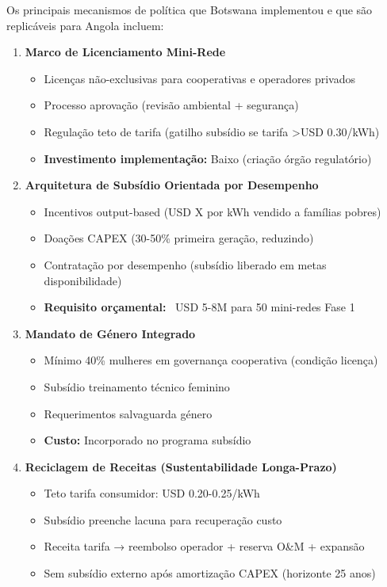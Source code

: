 \documentclass[12pt, a4paper]{article}
\begin{document}
{{{{{{{{{{{{{Os principais mecanismos de política que Botswana implementou e que são replicáveis para Angola incluem:

\begin{enumerate}
\item \textbf{Marco de Licenciamento Mini-Rede}
   \begin{itemize}
   \item Licenças não-exclusivas para cooperativas e operadores privados
   \item Processo aprovação (revisão ambiental + segurança)
   \item Regulação teto de tarifa (gatilho subsídio se tarifa >USD 0.30/kWh)
   \item \textbf{Investimento implementação:} Baixo (criação órgão regulatório)
   \end{itemize}

\item \textbf{Arquitetura de Subsídio Orientada por Desempenho}
   \begin{itemize}
   \item Incentivos output-based (USD X por kWh vendido a famílias pobres)
   \item Doações CAPEX (30-50\% primeira geração, reduzindo)
   \item Contratação por desempenho (subsídio liberado em metas disponibilidade)
   \item \textbf{Requisito orçamental:} ~USD 5-8M para 50 mini-redes Fase 1
   \end{itemize}

\item \textbf{Mandato de Género Integrado}
   \begin{itemize}
   \item Mínimo 40\% mulheres em governança cooperativa (condição licença)
   \item Subsídio treinamento técnico feminino
   \item Requerimentos salvaguarda género
   \item \textbf{Custo:} Incorporado no programa subsídio
   \end{itemize}

\item \textbf{Reciclagem de Receitas (Sustentabilidade Longa-Prazo)}
   \begin{itemize}
   \item Teto tarifa consumidor: USD 0.20-0.25/kWh
   \item Subsídio preenche lacuna para recuperação custo
   \item Receita tarifa → reembolso operador + reserva O\&M + expansão
   \item Sem subsídio externo após amortização CAPEX (horizonte 25 anos)
   \end{itemize}
\end{enumerate}

}}}}}}}}}}}}}
\end{document}
